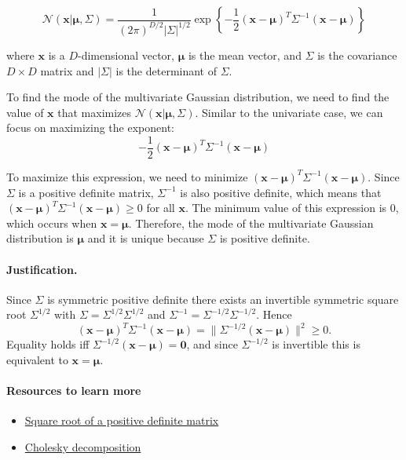 \documentclass{article}
\begin{document}
\begin{tcolorbox}[breakable,colback=gray!5,colframe=gray!60,title=Solution]
\begin{equation}
  \mathcal{N}(\mathbf{x}|\boldsymbol{\mu},\Sigma) = \frac{1}{(2\pi)^{D/2} |\Sigma|^{1/2}} \exp\left\{-\frac{1}{2}(\mathbf{x}-\boldsymbol{\mu})^T \Sigma^{-1} (\mathbf{x}-\boldsymbol{\mu})\right\} \tag{1.52}
\end{equation}

where \( \mathbf{x} \) is a \( D \)-dimensional vector, \( \boldsymbol{\mu} \) is the mean vector, and \( \Sigma \) is the covariance \( D \times D \) matrix and \( |\Sigma| \) is the determinant of \( \Sigma \).

\vspace{0.5em}
To find the mode of the multivariate Gaussian distribution, we need to find the value of \( \mathbf{x} \) 
that maximizes \( \mathcal{N}(\mathbf{x}|\boldsymbol{\mu},\Sigma) \). 
Similar to the univariate case, we can focus on maximizing the exponent:
\begin{equation}
  -\frac{1}{2}(\mathbf{x}-\boldsymbol{\mu})^T \Sigma^{-1} (\mathbf{x}-\boldsymbol{\mu})
\end{equation}

To maximize this expression, we need to minimize 
\( (\mathbf{x}-\boldsymbol{\mu})^T \Sigma^{-1} (\mathbf{x}-\boldsymbol{\mu}) \).
Since \( \Sigma \) is a positive definite matrix, \( \Sigma^{-1} \) is also positive definite, which means 
that \( (\mathbf{x}-\boldsymbol{\mu})^T \Sigma^{-1} (\mathbf{x}-\boldsymbol{\mu}) \geq 0 \) for all 
\( \mathbf{x} \). The minimum value of this expression is 0, which occurs when \( \mathbf{x} = \boldsymbol{\mu} \). 
Therefore, the mode of the multivariate Gaussian distribution is \( \boldsymbol{\mu} \) and it is unique 
because \( \Sigma \) is positive definite.
\vspace{1em}
\paragraph{Justification.}
Since \(\Sigma\) is symmetric positive definite there exists an invertible symmetric square root \(\Sigma^{1/2}\) with
\(\Sigma=\Sigma^{1/2}\Sigma^{1/2}\) and \(\Sigma^{-1}=\Sigma^{-1/2}\Sigma^{-1/2}\). Hence
\[
(\mathbf{x}-\boldsymbol{\mu})^T\Sigma^{-1}(\mathbf{x}-\boldsymbol{\mu})
= \|\Sigma^{-1/2}(\mathbf{x}-\boldsymbol{\mu})\|^2 \ge 0.
\]
Equality holds iff \(\Sigma^{-1/2}(\mathbf{x}-\boldsymbol{\mu})=\mathbf{0}\), and since \(\Sigma^{-1/2}\) is invertible this is equivalent to
\(\mathbf{x}=\boldsymbol{\mu}\).

\paragraph{Resources to learn more}
\begin{itemize}
  \item \href{https://en.wikipedia.org/wiki/Positive-definite_matrix#Square_root_of_a_positive-definite_matrix}{Square root of a positive definite matrix}
  \item \href{https://en.wikipedia.org/wiki/Positive-definite_matrix#Cholesky_decomposition}{Cholesky decomposition}
\end{itemize}

\end{tcolorbox}
\end{document}
